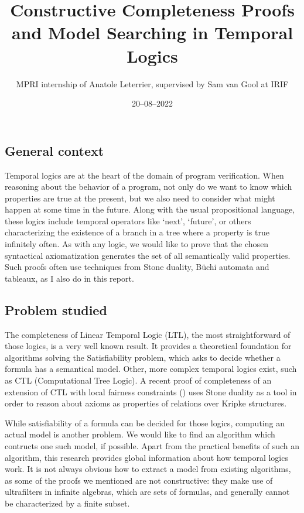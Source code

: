 \documentclass[11pt]{article}
\title{Constructive Completeness Proofs and Model Searching in Temporal Logics}
\author{MPRI internship of Anatole Leterrier, supervised by Sam van Gool at IRIF}
\date{20--08--2022}
\theoremstyle{definition}
\begin{document}
\maketitle

\section*{}

\subsection*{General context}
Temporal logics are at the heart of the domain of program verification.
When reasoning about the behavior of a program, not only do we want 
to know which properties are true at the present, but we also need 
to consider what might happen at some time in the future.
Along with the usual propositional language, these logics include
temporal operators like `next', `future', or others characterizing
the existence of a branch in a tree where a property is true
infinitely often.
As  with any logic, we would like to prove that the chosen syntactical
axiomatization generates the set of all semantically valid properties.
Such proofs often use techniques from Stone duality, Büchi automata and
tableaux, as I also do in this report.

\subsection*{Problem studied}
The completeness of Linear Temporal Logic (LTL), the most straightforward
of those logics, is a very well known result. It provides a
theoretical foundation for algorithms solving
the Satisfiability problem, which asks to decide whether a formula
has a semantical model. Other, more complex temporal logics exist, such 
as CTL (Computational Tree Logic). A recent proof of completeness 
of an extension of CTL with local fairness constraints (\cite{GhivG16}) 
uses Stone duality as a tool in order to
reason about axioms as properties of relations over Kripke structures. 

While satisfiability of a formula can be decided for those logics, computing
an actual model is another problem. We would like to find an algorithm
which contructs one such model, if possible. Apart from the practical
benefits of such an algorithm, this research provides global information 
about how temporal logics work. It is not always obvious how to extract
a model from existing algorithms, as some of
the proofs we mentioned are not constructive: they make use of
ultrafilters in infinite algebras, which are sets of formulas, and
generally cannot be characterized by a finite subset.
\end{document}

